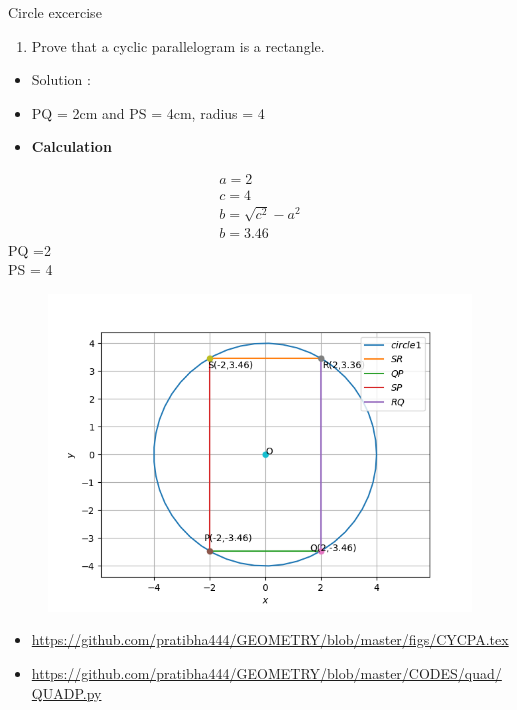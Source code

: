 \begin{frame}{Circle excercise}
\begin{enumerate}
\conti
\item Prove that a cyclic parallelogram is a rectangle.
\end{enumerate}
\seti
\begin{itemize}
\item Solution :
\begin{center}

\end{center}
\item PQ = 2cm and PS = 4cm, radius = 4
\end{itemize}
\end{frame}
\begin{frame}
\begin{itemize}
\item \textbf{Calculation}
\end{itemize}
\begin{align*}
a = 2\\
c = 4\\
b = \sqrt{c^2} - a ^2\\
b = 3.46
\end{align*}
PQ =2\\
PS = 4
\end{frame}
\begin{frame}
\begin{figure}
\includegraphics[scale=.4]{./CODES/quad/QUAD_P.png}
\end{figure}
\begin{itemize}
\item\url{https://github.com/pratibha444/GEOMETRY/blob/master/figs/CYCPA.tex}
\item\url{https://github.com/pratibha444/GEOMETRY/blob/master/CODES/quad/QUADP.py}
\end{itemize}
\end{frame}
